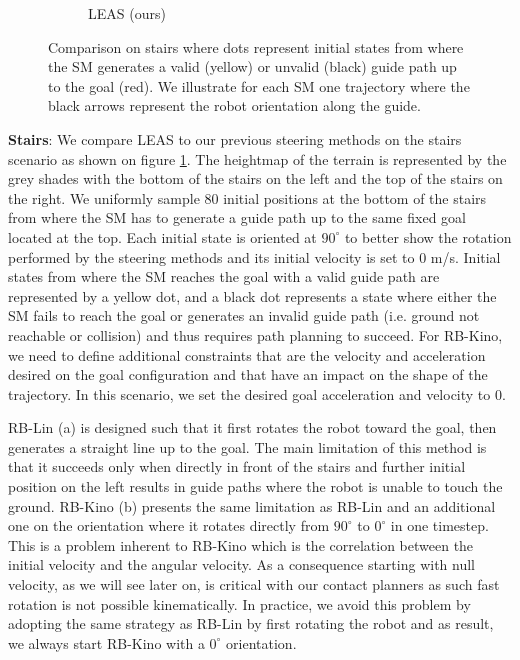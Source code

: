 \begin{figure}
\begin{subfigure}[t]{0.49\linewidth}
    \caption{LEAS (ours)}
    \end{subfigure}
    \caption{Comparison on stairs where dots represent initial states from where the SM generates a valid (yellow) or unvalid (black) guide path up to the goal (red). We illustrate for each SM one trajectory where the black arrows represent the robot orientation along the guide.}
    \label{fig:stairs_p1}
\end{figure}

\textbf{Stairs}: We compare LEAS to our previous steering methods on the stairs scenario as shown on figure \ref{fig:stairs_p1}. The heightmap of the terrain is represented by the grey shades with the bottom of the stairs on the left and the top of the stairs on the right. We uniformly sample 80 initial positions at the bottom of the stairs from where the SM has to generate a guide path up to the same fixed goal located at the top. Each initial state is oriented at $90^{\circ}$ to better show the rotation performed by the steering methods and its initial velocity is set to $0$ m/s. 
Initial states from where the SM reaches the goal with a valid guide path are represented by a yellow dot, and a black dot represents a state where either the SM fails to reach the goal or generates an invalid guide path (i.e. ground not reachable or collision) and thus requires path planning to succeed. 
For RB-Kino, we need to define additional constraints that are the velocity and acceleration desired on the goal configuration and that have an impact on the shape of the trajectory. In this scenario, we set the desired goal acceleration and velocity to $0$.

RB-Lin (a) is designed such that it first rotates the robot toward the goal, then generates a straight line up to the goal. The main limitation of this method is that it succeeds only when directly in front of the stairs and further initial position on the left results in guide paths where the robot is unable to touch the ground.
RB-Kino (b) presents the same limitation as RB-Lin and an additional one on the orientation where it rotates directly from $90^{\circ}$ to $0^{\circ}$ in one timestep. This is a problem inherent to RB-Kino which is the correlation between the initial velocity and the angular velocity. As a consequence starting with null velocity, as we will see later on, is critical with our contact planners as such fast rotation is not possible kinematically. 
In practice, we avoid this problem by adopting the same strategy as RB-Lin by first rotating the robot and as result, we always start RB-Kino with a $0^{\circ}$ orientation.

